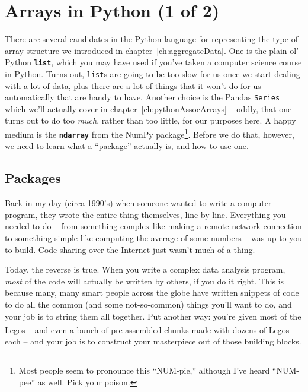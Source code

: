 


\chapter{Arrays in Python (1 of 2)}
\label{ch:arraysInPython1}

There are several candidates in the Python language for representing the type
of array structure we introduced in chapter~\ref{ch:aggregateData}. One is the
plain-ol' Python \textbf{\texttt{list}}, which you may have used if you've
taken a computer science course in Python. Turns out, \texttt{list}s are going
to be too slow for us once we start dealing with a lot of data, plus there are
a lot of things that it won't do for us automatically that are handy to have.
Another choice is the Pandas \texttt{Series} which we'll actually cover in
chapter~\ref{ch:pythonAssocArrays} -- oddly, that one turns out to do too
\textit{much}, rather than too little, for our purposes here. A happy medium is
the \textbf{\texttt{ndarray}} from the NumPy package\footnote{Most people seem
to pronounce this ``NUM-pie,'' although I've heard ``NUM-pee'' as well. Pick
your poison.}. Before we do that, however, we need to learn what a ``package''
actually is, and how to use one.

\section{Packages}

Back in my day (circa 1990's) when someone wanted to write a computer program,
they wrote the entire thing themselves, line by line. Everything you needed to
do -- from something complex like making a remote network connection to
something simple like computing the average of some numbers -- was up to you to
build. Code sharing over the Internet just wasn't much of a thing.

Today, the reverse is true. When you write a complex data analysis program,
\textit{most} of the code will actually be written by others, if you do it
right. This is because many, many smart people across the globe have written
snippets of code to do all the common (and some not-so-common) things you'll
want to do, and your job is to string them all together. Put another way:
you're given most of the Legos\textsuperscript{\textregistered} -- and even a
bunch of pre-assembled chunks made with dozens of
Legos\textsuperscript{\textregistered} each -- and your job is to construct
your masterpiece out of those building blocks.

